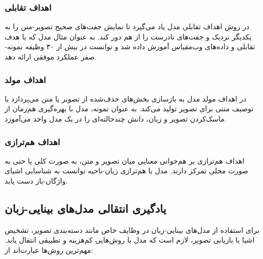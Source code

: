 \subsubsection{اهداف تقابلی}
در روش اهداف تقابلی 
مدل یاد می‌گیرد تا نمایش جفت‌های صحیح تصویر-متن را به یکدیگر نزدیک و جفت‌های نادرست را از هم دور کند. به عنوان مثال 
مدل 
 که با هدف تقابلی و داده‌های وب‌مقیاس آموزش داده شد و توانست در بیش از ۳۰ وظیفه نمونه-صفر عملکرد موفقی ارائه دهد.

\subsubsection{اهداف مولد}
در اهداف مولد
مدل به بازسازی بخش‌های حذف‌شده از تصویر یا متن می‌پردازد یا توصیف متنی برای تصویر تولید می‌کند. به عنوان نمونه، مدل
\cite{flava}
با بهره‌گیری هم‌زمان از ماسک‌کردن تصویر و زبان، دانش چندحالته‌ای را در یک مدل واحد می‌آموزد.

\subsubsection{اهداف هم‌ترازی}
اهداف هم‌ترازی
بر هم‌خوانی معنایی میان تصویر و متن،
به صورت کلی
یا حتی به صورت محلی
تمرکز دارند. مدل 
\cite{glip}
با هم‌ترازی زبان-ناحیه توانست به شناسایی اشیای واژگان-باز
دست یابد.

\subsection{یادگیری انتقالی مدل‌های بینایی-زبان}
برای استفاده از مدل‌های بینایی-زبان در وظایف خاص مانند دسته‌بندی تصویر، تشخیص اشیا یا بازیابی تصویر، لازم است که مدل با روش‌هایی کم‌هزینه و تطبیقی انتقال یابد. مهم‌ترین روش‌ها عبارت‌اند از:
